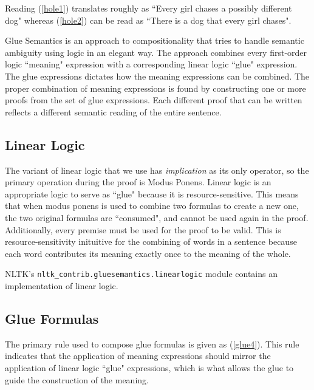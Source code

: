 \documentclass{article}
\newcommand{\dhgcode}[1]{{\tt #1}}
\begin{document}

Reading (\ref{hole1}) translates roughly as ``Every girl chases a possibly different dog" whereas (\ref{hole2}) can be read as ``There is a dog that every girl chases".  

Glue Semantics is an approach to compositionality that tries to handle semantic ambiguity using logic in an elegant way.  The approach combines every first-order logic ``meaning" expression with a corresponding linear logic ``glue" expression.  The glue expressions dictates how the meaning expressions can be combined.  The proper combination of meaning expressions is found by constructing one or more proofs from the set of glue expressions.  Each different proof that can be written reflects a different semantic reading of the entire sentence.  

\subsection{Linear Logic}
The variant of linear logic that we use has \emph{implication} as its only operator, so the primary operation during the proof is Modus Ponens.  Linear logic is an appropriate logic to serve as ``glue" because it is resource-sensitive.  This means that when modus ponens is used to combine two formulas to create a new one, the two original formulas are ``consumed", and cannot be used again in the proof.  Additionally, every premise must be used for the proof to be valid.  This is resource-sensitivity inituitive for the combining of words in a sentence because each word contributes its meaning exactly once to the meaning of the whole.


NLTK's \dhgcode{nltk\_contrib.gluesemantics.linearlogic} module contains an implementation of linear logic.

\subsection{Glue Formulas}
The primary rule used to compose glue formulas is given as (\ref{glue4}).  This rule indicates that the application of meaning expressions should mirror the application of linear logic ``glue" expressions, which is what allows the glue to guide the construction of the meaning.
\end{document}
